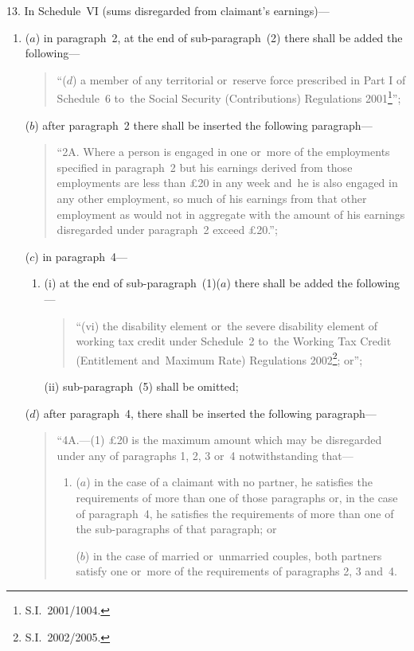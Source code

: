 \documentclass[12pt,a4paper]{article}
\begin{document}
13.  In Schedule~VI (sums disregarded from claimant’s earnings)—
\begin{enumerate}\item[]
($a$) in paragraph~2, at the end of sub-paragraph~(2) there shall be added the following—
\begin{quotation}
“($d$) a member of any territorial or~reserve force prescribed in Part I of Schedule~6 to~the Social Security (Contributions) Regulations 2001\footnote{S.I.~2001/1004.}”;
\end{quotation}

($b$) after paragraph~2 there shall be inserted the following paragraph—
\begin{quotation}
“2A.  Where a person is engaged in one or~more of the employments specified in paragraph~2 but his earnings derived from those employments are less than £20 in any week and~he is also engaged in any other employment, so much of his earnings from that other employment as would not in aggregate with the amount of his earnings disregarded under paragraph~2 exceed £20.”;
\end{quotation}

($c$) in paragraph~4—
\begin{enumerate}\item[]
(i) at the end of sub-paragraph~(1)($a$)  there shall be added the following—
\begin{quotation}
“(vi) the disability element or~the severe disability element of working tax credit under Schedule~2 to~the Working Tax Credit (Entitlement and~Maximum Rate) Regulations 2002\footnote{S.I.~2002/2005.}; or”;
\end{quotation}

(ii) sub-paragraph~(5) shall be omitted;
\end{enumerate}

($d$) after paragraph~4, there shall be inserted the following paragraph—
\begin{quotation}
“4A.---(1)  £20 is the maximum amount which may be disregarded under any of paragraphs 1, 2, 3 or~4 notwithstanding that—
\begin{enumerate}\item[]
($a$) in the case of a claimant with no partner, he satisfies the requirements of more than one of those paragraphs or, in the case of paragraph~4, he satisfies the requirements of more than one of the sub-paragraphs of that paragraph; or

($b$) in the case of married or~unmarried couples, both partners satisfy one or~more of the requirements of paragraphs 2, 3 and~4.
\end{enumerate}


\end{quotation}
\end{enumerate}
\end{document}
